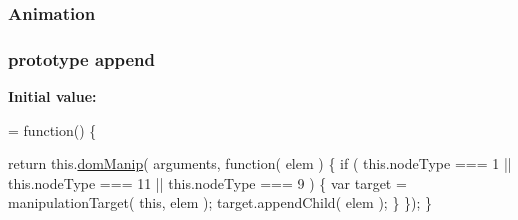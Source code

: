 \subsubsection[{Animation}]{ Animation}\label{jquery-1_810_82-vsdoc_8js_a3299b781c8ec8287357326920ab3565a}
\hypertarget{jquery-1_810_82-vsdoc_8js_a6b9ad5e0cf5c7480e9a327c771349a90}{}
\subsubsection[{append}]{ {\bf prototype} append}\label{jquery-1_810_82-vsdoc_8js_a6b9ad5e0cf5c7480e9a327c771349a90}
{\bfseries Initial value\+:}
\begin{DoxyCode}
= \textcolor{keyword}{function}() \{


        \textcolor{keywordflow}{return} this.\hyperlink{jquery-1_810_82-vsdoc_8js_a00a63bd312ef048290dc1755ccb8bae4}{domManip}( arguments, \textcolor{keyword}{function}( elem ) \{
            \textcolor{keywordflow}{if} ( this.nodeType === 1 || this.nodeType === 11 || this.nodeType === 9 ) \{
                var target = manipulationTarget( \textcolor{keyword}{this}, elem );
                target.appendChild( elem );
            \}
        \});
    \}
\end{DoxyCode}
\hypertarget{jquery-1_810_82-vsdoc_8js_a74dc247b9c1e66b8cd2aad9037eeaca5}{}
